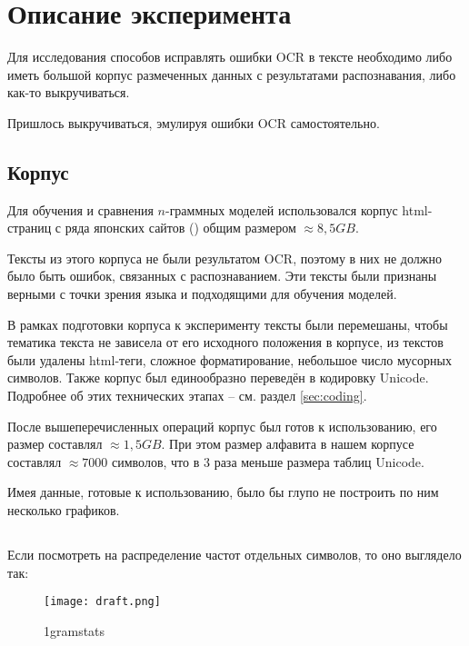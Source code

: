 \section{ Описание эксперимента }\label{sec:experiment}

Для исследования способов исправлять ошибки OCR в тексте необходимо либо иметь большой корпус размеченных данных с результатами распознавания, либо как-то выкручиваться. 

Пришлось выкручиваться, эмулируя ошибки OCR самостоятельно.


\subsection{ Корпус }

Для обучения и сравнения $n$-граммных моделей использовался корпус html-страниц с ряда японских сайтов () общим размером $\approx 8,5 GB$. 

Тексты из этого корпуса не были результатом OCR, поэтому в них не должно было быть ошибок, связанных с распознаванием. Эти тексты были признаны верными с точки зрения языка и подходящими для обучения моделей.

В рамках подготовки корпуса к эксперименту тексты были перемешаны, чтобы тематика текста не зависела от его исходного положения в корпусе, из текстов были удалены html-теги, сложное форматирование, небольшое число мусорных символов. Также корпус был единообразно переведён в кодировку Unicode. Подробнее об этих технических этапах -- см. раздел \ref{sec:coding}.

После вышеперечисленных операций корпус был готов к использованию, его размер составлял $\approx 1,5 GB$. При этом размер алфавита в нашем корпусе составлял $\approx 7000$ символов, что в 3 раза меньше размера таблиц Unicode.

Имея данные, готовые к использованию, было бы глупо не построить по ним несколько графиков.

\subsection{  }

Если посмотреть на распределение частот отдельных символов, то оно выглядело так:

\begin{figure}[H]
	\centering
	\texttt{[image: draft.png]}
	\caption{1gramstats}
	\label{fig:1gramstats_all}
\end{figure}

